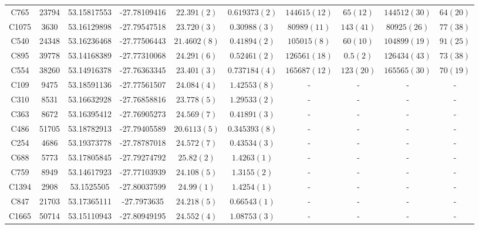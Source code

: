\documentclass[12pt, twocolumn]{revtex4-1}    %
\begin{document}
\begin{table}
\begin{tabular}{c@{\hskip 10pt}c@{\hskip 10pt}c@{\hskip 10pt}c@{\hskip 10pt}c@{\hskip 10pt}c@{\hskip 10pt}c@{\hskip 10pt}c@{\hskip 10pt}c@{\hskip 10pt}c}
C765 & 23794 & 53.15817553 & -27.78109416 & $22.391(2)$ & $0.619373(2)$ & $144615(12)$ & $65(12)$ & $144512(30)$ & $ 64(20)$ \\ 

C1075 & 3630 & 53.16129898 & -27.79547518 & $23.720(3)$ & $0.30988(3)$ & $80989(11)$ & $143(41)$ & $80925(26)$ & $ 77(38)$ \\ 

C540 & 24348 & 53.16236468 & -27.77506443 & $21.4602(8)$ & $0.41894(2)$ & $105015(8)$ & $60(10)$ & $104899(19)$ & $ 91(25)$ \\ 

C895 & 39778 & 53.14168389 & -27.77310068 & $24.291(6)$ & $0.52461(2)$ & $126561(18)$ & $0.5(2)$ & $126434(43)$ & $ 73(38)$ \\ 

C554 & 38260 & 53.14916378 & -27.76363345 & $23.401(3)$ & $0.737184(4)$ & $165687(12)$ & $123(20)$ & $165565(30)$ & $ 70(19)$ \\

C109 & 9475 & 53.18591136 & -27.77561507 & $24.084(4)$ & $1.42553(8)$ & - & - & - & - \\ 

C310 & 8531 & 53.16632928 & -27.76858816 & $23.778(5)$ & $1.29533(2)$ & - & - & - & - \\ 

C363 & 8672 & 53.16395412 & -27.76905273 & $24.569(7)$ & $0.41891(3)$ & - & - & - & - \\ 

C486 & 51705 & 53.18782913 & -27.79405589 & $20.6113(5)$ & $0.345393(8)$ & - & - & - & - \\ 

C254 & 4686 & 53.19373778 & -27.78787018 & $24.572(7)$ & $0.43534(3)$ & - & - & - & - \\ 

C688 & 5773 & 53.17805845 & -27.79274792 & $25.82(2)$ & $1.4263(1)$ & - & - & - & - \\ 

C759 & 8949 & 53.14617923 & -27.77103939 & $24.108(5)$ & $1.3155(2)$ & - & - & - & - \\ 

C1394 & 2908 & 53.1525505 & -27.80037599 & $24.99(1)$ & $1.4254(1)$ & - & - & - & - \\ 

C847 & 21703 & 53.17365111 & -27.7973635 & $24.218(5)$ & $0.66543(1)$ & - & - & - & - \\ 

C1665 & 50714 & 53.15110943 & -27.80949195 & $24.552(4)$ & $1.08753(3)$ & - & - & - & - \\ 


\end{tabular}
\end{table}
\end{document}
